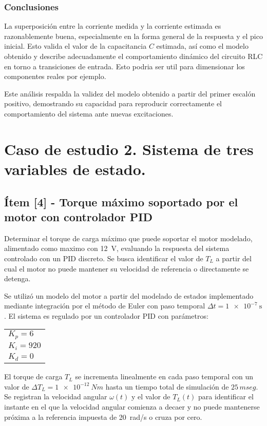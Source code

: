\documentclass{article}
\begin{document}
\subsubsection*{Conclusiones}

La superposición entre la corriente medida y la corriente estimada es razonablemente buena, especialmente en la forma general de la respuesta y el pico inicial. Esto valida el valor de la capacitancia $C$ estimada, así como el modelo obtenido y describe adecuadamente el comportamiento dinámico del circuito RLC en torno a transiciones de entrada. Esto podria ser util para dimensionar los componentes reales por ejemplo.

Este análisis respalda la validez del modelo obtenido a partir del primer escalón positivo, demostrando su capacidad para reproducir correctamente el comportamiento del sistema ante nuevas excitaciones.

\section{Caso de estudio 2. Sistema de tres variables de estado.}
\subsection*{Ítem [4] - Torque máximo soportado por el motor con controlador PID}

Determinar el torque de carga máximo que puede soportar el motor modelado, alimentado como maximo con \SI{12}{\volt},  evaluando la respuesta del sistema controlado con un PID discreto. Se busca identificar el valor de $T_L$ a partir del cual el motor no puede mantener su velocidad de referencia o directamente se detenga.

Se utilizó un modelo del motor a partir del modelado de estados implementado mediante integración por el método de Euler con paso temporal $\Delta t = \SI{1e-7}{\second}$. El sistema es regulado por un controlador PID con parámetros:
\begin{center}
\begin{tabular}{l}
  \hline
  $K_p = 6$   \\
  $K_i = 920$ \\
  $K_d = 0$   \\
  \hline
\end{tabular}
\end{center}

El torque de carga $T_L$ se incrementa linealmente en cada paso temporal con un valor de $\Delta T_L = \SI{1e-12}{Nm}$ hasta un tiempo total de simulación de $25 \, mseg$. Se registran la velocidad angular $\omega(t)$ y el valor de $T_L(t)$ para identificar el instante en el que la velocidad angular comienza a decaer y no puede mantenerse próxima a la referencia impuesta de \SI{20}{rad/s} o cruza por cero.
\end{document}
